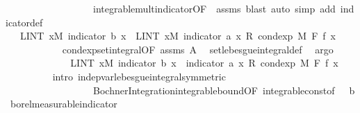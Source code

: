 \begin{isabellebody}
\ \ \ \ \ \ \ \ \ \ \ \ \ \ \ \ \ \ integrable{\isacharunderscore}{\kern0pt}mult{\isacharunderscore}{\kern0pt}indicator{\isacharbrackleft}{\kern0pt}OF\ {\isacharunderscore}{\kern0pt}\ assms{\isacharparenleft}{\kern0pt}{}{\isacharparenright}{\kern0pt}{\isacharbrackright}{\kern0pt}{\isacharcomma}{\kern0pt}\ blast{\isacharparenright}{\kern0pt}\ {\isacharparenleft}{\kern0pt}auto\ simp\ add{\isacharcolon}{\kern0pt}\ indicator{\isacharunderscore}{\kern0pt}def{\isacharparenright}{\kern0pt}\isanewline
\ \ \ \ \ \ \ \ \isamarkupfalse%
\ \isamarkupfalse%
\ {\isachardoublequoteopen}{\isachardot}{\kern0pt}{\isachardot}{\kern0pt}{\isachardot}{\kern0pt}\ {\isacharequal}{\kern0pt}\ {\isacharparenleft}{\kern0pt}LINT\ x{\isacharbar}{\kern0pt}M{\isachardot}{\kern0pt}\ indicator\ b\ x{\isacharparenright}{\kern0pt}\ {\isacharasterisk}{\kern0pt}\ {\isacharparenleft}{\kern0pt}LINT\ x{\isacharbar}{\kern0pt}M{\isachardot}{\kern0pt}\ indicator\ a\ x\ {\isacharasterisk}{\kern0pt}\isactrlsub R\ cond{\isacharunderscore}{\kern0pt}exp\ M\ F\ f\ x{\isacharparenright}{\kern0pt}{\isachardoublequoteclose}\ \isanewline
\ \ \ \ \ \ \ \ \ \ \isamarkupfalse%
\ cond{\isacharunderscore}{\kern0pt}exp{\isacharunderscore}{\kern0pt}set{\isacharunderscore}{\kern0pt}integral{\isacharbrackleft}{\kern0pt}OF\ assms{\isacharparenleft}{\kern0pt}{}{\isacharparenright}{\kern0pt}\ A{\isacharparenleft}{\kern0pt}{}{\isacharparenright}{\kern0pt}{\isacharbrackright}{\kern0pt}\ \isamarkupfalse%
\ set{\isacharunderscore}{\kern0pt}lebesgue{\isacharunderscore}{\kern0pt}integral{\isacharunderscore}{\kern0pt}def\ \isamarkupfalse%
\ argo\isanewline
\ \ \ \ \ \ \ \ \isamarkupfalse%
\ \isamarkupfalse%
\ {\isachardoublequoteopen}{\isachardot}{\kern0pt}{\isachardot}{\kern0pt}{\isachardot}{\kern0pt}\ {\isacharequal}{\kern0pt}\ {\isacharparenleft}{\kern0pt}LINT\ x{\isacharbar}{\kern0pt}M{\isachardot}{\kern0pt}\ indicator\ b\ x\ {\isacharasterisk}{\kern0pt}\ {\isacharparenleft}{\kern0pt}indicator\ a\ x\ {\isacharasterisk}{\kern0pt}\isactrlsub R\ cond{\isacharunderscore}{\kern0pt}exp\ M\ F\ f\ x{\isacharparenright}{\kern0pt}{\isacharparenright}{\kern0pt}{\isachardoublequoteclose}\isanewline
\ \ \ \ \ \ \ \ \isamarkupfalse%
\ {\isacharparenleft}{\kern0pt}intro\ indep{\isacharunderscore}{\kern0pt}var{\isacharunderscore}{\kern0pt}lebesgue{\isacharunderscore}{\kern0pt}integral{\isacharbrackleft}{\kern0pt}symmetric{\isacharbrackright}{\kern0pt}\isanewline
\ \ \ \ \ \ \ \ \ \ \ \ \ \ \ \ \ \ Bochner{\isacharunderscore}{\kern0pt}Integration{\isachardot}{\kern0pt}integrable{\isacharunderscore}{\kern0pt}bound{\isacharbrackleft}{\kern0pt}OF\ integrable{\isacharunderscore}{\kern0pt}const{\isacharbrackleft}{\kern0pt}of\ {\isachardoublequoteopen}{}\ {\isacharcolon}{\kern0pt}{\isacharcolon}{\kern0pt}\ {\isacharprime}{\kern0pt}b{\isachardoublequoteclose}{\isacharbrackright}{\kern0pt}\ borel{\isacharunderscore}{\kern0pt}measurable{\isacharunderscore}{\kern0pt}indicator{\isacharbrackright}{\kern0pt}\isanewline

\end{isabellebody}
